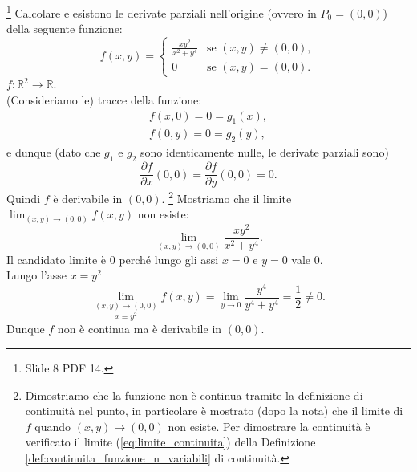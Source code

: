 \begin{example}\footnote{Slide 8 PDF 14.}
    Calcolare e esistono le derivate parziali nell'origine (ovvero in $P_0=(0,0)$) della seguente funzione:
    \begin{equation*}
        f(x,y)=
        \begin{cases}
            \frac{xy^2}{x^2+y^4} & \text{se } (x,y)\neq (0,0),\\
            0 & \text{se } (x,y)=(0,0).
        \end{cases}
    \end{equation*}
    $f:\mathbb R^2\rightarrow\mathbb R$.\\
    (Consideriamo le) tracce della funzione:
    \begin{equation*}
        \begin{matrix}
            f(x,0)=0=g_1(x),\\
            f(0,y)=0=g_2(y),
        \end{matrix}
    \end{equation*}
    e dunque (dato che $g_1$ e $g_2$ sono identicamente nulle, le derivate parziali sono)
    \begin{equation*}
        \frac{\partial f}{\partial x}(0,0)=\frac{\partial f}{\partial y}(0,0)=0.
    \end{equation*}
    Quindi $f$ è derivabile in $(0,0)$. \footnote{Dimostriamo che la funzione non è continua tramite la definizione di continuità nel punto, in particolare è mostrato (dopo la nota) che il limite di $f$ quando $(x,y)\rightarrow (0,0)$ non esiste. Per dimostrare la continuità è verificato il limite (\ref{eq:limite_continuita}) della Definizione \ref{def:continuita_funzione_n_variabili} di continuità.} Mostriamo che il limite $\lim_{(x,y)\rightarrow(0,0)}f(x,y)$ non esiste:
    \begin{equation*}
        \lim_{(x,y)\rightarrow(0,0)}\frac{xy^2}{x^2+y^4}.
    \end{equation*}
    Il candidato limite è 0 perché lungo gli assi $x=0$ e $y=0$ vale 0.\\
    Lungo l'asse $x=y^2$
    \begin{equation*}
        \underset{x=y^2}{\lim_{(x,y)\rightarrow(0,0)}}f(x,y)=\lim_{y\rightarrow 0}\frac{y^4}{y^4+y^4}=\frac{1}{2}\neq 0.
    \end{equation*}
    Dunque $f$ non è continua ma è derivabile in $(0,0)$.
\end{example}

